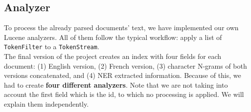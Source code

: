 \subsection{Analyzer}\label{subsec:analyzer}
To process the already parsed documents' text, we have implemented our own Lucene analyzers.
All of them follow the typical workflow: apply a list of \texttt{TokenFilter} to a \texttt{TokenStream}.\\
The final version of the project creates an index with four fields for each document: (1) English version, (2) French
version, (3) character N-grams of both versions concatenated, and (4) NER extracted information.
Because of this, we had to create \textbf{four different analyzers}.
Note that we are not taking into account the first field which is the id, to which no processing is applied.
We will explain them independently.

